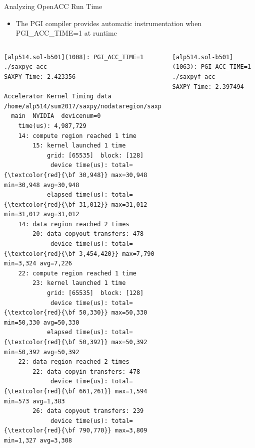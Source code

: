 \documentclass[10pt,t]{beamer}
\begin{document}
\begin{frame}[fragile]{Analyzing OpenACC Run Time}
  \begin{itemize}
    \item The PGI compiler provides automatic instrumentation when {\color{orange}PGI\_ACC\_TIME=1} at runtime
  \end{itemize}
  \begin{block}{}
    \begin{columns}[t]
    \begin{Verbatim}[fontsize=\fontsize{3.5}{4.5}\selectfont,commandchars=\\\{\}]
[alp514.sol-b501](1008): PGI_ACC_TIME=1 ./saxpyc_acc
SAXPY Time: 2.423356

Accelerator Kernel Timing data
/home/alp514/sum2017/saxpy/nodataregion/saxpy_acc.c
  main  NVIDIA  devicenum=0
    time(us): 4,987,729
    14: compute region reached 1 time
        15: kernel launched 1 time
            grid: [65535]  block: [128]
             device time(us): total={\textcolor{red}{\bf 30,948}} max=30,948 min=30,948 avg=30,948
            elapsed time(us): total={\textcolor{red}{\bf 31,012}} max=31,012 min=31,012 avg=31,012
    14: data region reached 2 times
        20: data copyout transfers: 478
             device time(us): total={\textcolor{red}{\bf 3,454,420}} max=7,790 min=3,324 avg=7,226
    22: compute region reached 1 time
        23: kernel launched 1 time
            grid: [65535]  block: [128]
             device time(us): total={\textcolor{red}{\bf 50,330}} max=50,330 min=50,330 avg=50,330
            elapsed time(us): total={\textcolor{red}{\bf 50,392}} max=50,392 min=50,392 avg=50,392
    22: data region reached 2 times
        22: data copyin transfers: 478
             device time(us): total={\textcolor{red}{\bf 661,261}} max=1,594 min=573 avg=1,383
        26: data copyout transfers: 239
             device time(us): total={\textcolor{red}{\bf 790,770}} max=3,809 min=1,327 avg=3,308
    \end{Verbatim}
    \begin{Verbatim}[fontsize=\fontsize{3.5}{4.5}\selectfont,commandchars=\\\{\}]
[alp514.sol-b501](1063): PGI_ACC_TIME=1 ./saxpyf_acc
SAXPY Time: 2.397494


\end{Verbatim}
\end{columns}
\end{block}
\end{frame}
\end{document}
